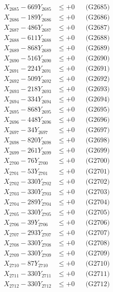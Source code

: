 \documentclass[a4paper,10pt]{article}
\begin{document}
{\begin{align}
X_{2685} - 669Y_{2685} &\leq +0 && \text{(G2685)} \\
X_{2686} - 189Y_{2686} &\leq +0 && \text{(G2686)} \\
X_{2687} - 486Y_{2687} &\leq +0 && \text{(G2687)} \\
X_{2688} - 611Y_{2688} &\leq +0 && \text{(G2688)} \\
X_{2689} - 868Y_{2689} &\leq +0 && \text{(G2689)} \\
X_{2690} - 516Y_{2690} &\leq +0 && \text{(G2690)} \\
\allowbreak
X_{2691} - 224Y_{2691} &\leq +0 && \text{(G2691)} \\
X_{2692} - 509Y_{2692} &\leq +0 && \text{(G2692)} \\
X_{2693} - 218Y_{2693} &\leq +0 && \text{(G2693)} \\
X_{2694} - 334Y_{2694} &\leq +0 && \text{(G2694)} \\
X_{2695} - 868Y_{2695} &\leq +0 && \text{(G2695)} \\
X_{2696} - 448Y_{2696} &\leq +0 && \text{(G2696)} \\
X_{2697} - 34Y_{2697} &\leq +0 && \text{(G2697)} \\
X_{2698} - 820Y_{2698} &\leq +0 && \text{(G2698)} \\
X_{2699} - 261Y_{2699} &\leq +0 && \text{(G2699)} \\
X_{2700} - 76Y_{2700} &\leq +0 && \text{(G2700)} \\
\allowbreak
X_{2701} - 53Y_{2701} &\leq +0 && \text{(G2701)} \\
X_{2702} - 330Y_{2702} &\leq +0 && \text{(G2702)} \\
X_{2703} - 330Y_{2703} &\leq +0 && \text{(G2703)} \\
X_{2704} - 289Y_{2704} &\leq +0 && \text{(G2704)} \\
X_{2705} - 330Y_{2705} &\leq +0 && \text{(G2705)} \\
X_{2706} - 39Y_{2706} &\leq +0 && \text{(G2706)} \\
X_{2707} - 293Y_{2707} &\leq +0 && \text{(G2707)} \\
X_{2708} - 330Y_{2708} &\leq +0 && \text{(G2708)} \\
X_{2709} - 330Y_{2709} &\leq +0 && \text{(G2709)} \\
X_{2710} - 87Y_{2710} &\leq +0 && \text{(G2710)} \\
\allowbreak
X_{2711} - 330Y_{2711} &\leq +0 && \text{(G2711)} \\
X_{2712} - 330Y_{2712} &\leq +0 && \text{(G2712)} \\

\end{align}}
\end{document}
